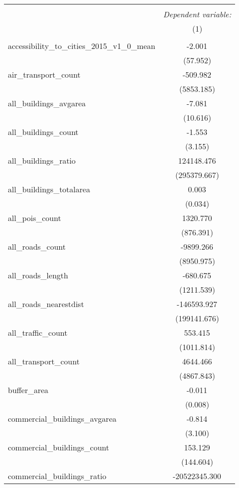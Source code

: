 \begin{table}[!htbp] \centering
\begin{tabular}{@{\extracolsep{5pt}}lc}
\\[-1.8ex]\hline
\hline \\[-1.8ex]
& \multicolumn{1}{c}{\textit{Dependent variable:}} \
\cr \cline{1-2}
\\[-1.8ex] & (1) \\
\hline \\[-1.8ex]
 accessibility_to_cities_2015_v1_0_mean & -2.001$^{}$ \\
  & (57.952) \\
 air_transport_count & -509.982$^{}$ \\
  & (5853.185) \\
 all_buildings_avgarea & -7.081$^{}$ \\
  & (10.616) \\
 all_buildings_count & -1.553$^{}$ \\
  & (3.155) \\
 all_buildings_ratio & 124148.476$^{}$ \\
  & (295379.667) \\
 all_buildings_totalarea & 0.003$^{}$ \\
  & (0.034) \\
 all_pois_count & 1320.770$^{}$ \\
  & (876.391) \\
 all_roads_count & -9899.266$^{}$ \\
  & (8950.975) \\
 all_roads_length & -680.675$^{}$ \\
  & (1211.539) \\
 all_roads_nearestdist & -146593.927$^{}$ \\
  & (199141.676) \\
 all_traffic_count & 553.415$^{}$ \\
  & (1011.814) \\
 all_transport_count & 4644.466$^{}$ \\
  & (4867.843) \\
 buffer_area & -0.011$^{}$ \\
  & (0.008) \\
 commercial_buildings_avgarea & -0.814$^{}$ \\
  & (3.100) \\
 commercial_buildings_count & 153.129$^{}$ \\
  & (144.604) \\
 commercial_buildings_ratio & -20522345.300$^{}$ \\

\end{tabular}
\end{table}
